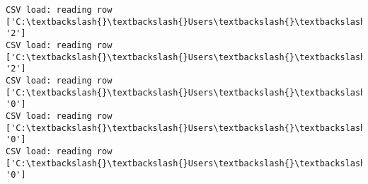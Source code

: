 \documentclass[11pt]{article}
\begin{document}
\begin{Verbatim}[commandchars=\\\{\}]
CSV load: reading row ['C:\textbackslash{}\textbackslash{}Users\textbackslash{}\textbackslash{}AbhishekGangadhar\textbackslash{}\textbackslash{}Downloads\textbackslash{}\textbackslash{}ActionRecog\textbackslash{}\textbackslash{}ActionRecog\textbackslash{}\textbackslash{}DataSets\textbackslash{}\textbackslash{}UCF11\textbackslash{}\textbackslash{}action\_youtube\_naudio\textbackslash{}\textbackslash{}trampoline\_jumping\textbackslash{}\textbackslash{}v\_jumping\_23\textbackslash{}\textbackslash{}v\_jumping\_23\_03.avi', '2']
CSV load: reading row ['C:\textbackslash{}\textbackslash{}Users\textbackslash{}\textbackslash{}AbhishekGangadhar\textbackslash{}\textbackslash{}Downloads\textbackslash{}\textbackslash{}ActionRecog\textbackslash{}\textbackslash{}ActionRecog\textbackslash{}\textbackslash{}DataSets\textbackslash{}\textbackslash{}UCF11\textbackslash{}\textbackslash{}action\_youtube\_naudio\textbackslash{}\textbackslash{}trampoline\_jumping\textbackslash{}\textbackslash{}v\_jumping\_23\textbackslash{}\textbackslash{}v\_jumping\_23\_04.avi', '2']
CSV load: reading row ['C:\textbackslash{}\textbackslash{}Users\textbackslash{}\textbackslash{}AbhishekGangadhar\textbackslash{}\textbackslash{}Downloads\textbackslash{}\textbackslash{}ActionRecog\textbackslash{}\textbackslash{}ActionRecog\textbackslash{}\textbackslash{}DataSets\textbackslash{}\textbackslash{}UCF11\textbackslash{}\textbackslash{}action\_youtube\_naudio\textbackslash{}\textbackslash{}biking\textbackslash{}\textbackslash{}v\_biking\_15\textbackslash{}\textbackslash{}v\_biking\_15\_01.avi', '0']
CSV load: reading row ['C:\textbackslash{}\textbackslash{}Users\textbackslash{}\textbackslash{}AbhishekGangadhar\textbackslash{}\textbackslash{}Downloads\textbackslash{}\textbackslash{}ActionRecog\textbackslash{}\textbackslash{}ActionRecog\textbackslash{}\textbackslash{}DataSets\textbackslash{}\textbackslash{}UCF11\textbackslash{}\textbackslash{}action\_youtube\_naudio\textbackslash{}\textbackslash{}biking\textbackslash{}\textbackslash{}v\_biking\_15\textbackslash{}\textbackslash{}v\_biking\_15\_02.avi', '0']
CSV load: reading row ['C:\textbackslash{}\textbackslash{}Users\textbackslash{}\textbackslash{}AbhishekGangadhar\textbackslash{}\textbackslash{}Downloads\textbackslash{}\textbackslash{}ActionRecog\textbackslash{}\textbackslash{}ActionRecog\textbackslash{}\textbackslash{}DataSets\textbackslash{}\textbackslash{}UCF11\textbackslash{}\textbackslash{}action\_youtube\_naudio\textbackslash{}\textbackslash{}biking\textbackslash{}\textbackslash{}v\_biking\_15\textbackslash{}\textbackslash{}v\_biking\_15\_03.avi', '0']

\end{Verbatim}
\end{document}
